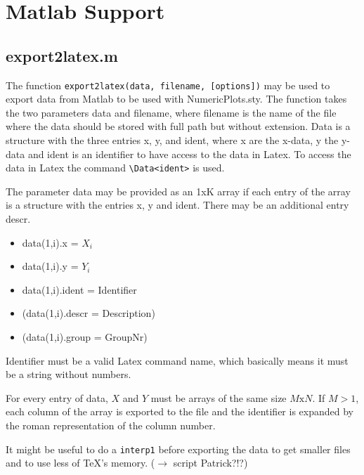 
\section{Matlab Support}


\subsection{export2latex.m}
The function \texttt{export2latex(data, filename, [options])} may be used to
export data from Matlab to be used with NumericPlots.sty. The function takes the
two parameters data and filename, where filename is the name of the file where
the data should be stored with full path but without extension. Data is a
structure with the three entries x, y, and ident, where x are the x-data, y the
y-data and ident is an identifier to have access to the data in Latex. To access
the data in Latex the command \verb+\Data<ident>+ is used.

The parameter data may be provided as an 1xK array if each entry of the array is
a structure with the entries x, y and ident. There may be an additional entry
descr.
\begin{itemize}
  \item data(1,i).x = $X_i$
  \item data(1,i).y = $Y_i$
  \item data(1,i).ident = Identifier
  \item (data(1,i).descr = Description)
  \item (data(1,i).group = GroupNr)
\end{itemize}
Identifier must be a valid Latex command name, which basically means it must be
a string without numbers.

For every entry of data, $X$ and $Y$ must be arrays of the same size
$M\text{x}N$. If $M>1$, each column of the array is exported to the file and the
identifier is expanded by the roman representation of the column number.

It might be useful to do a \texttt{interp1} before exporting the data to get
smaller files and to use less of \TeX's memory. ($\rightarrow$ script
Patrick?!?)

